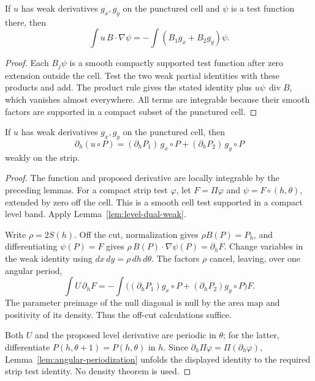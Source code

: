 \begin{lemma}
\label{lem:level-dual-weak}
\leanok
If $u$ has weak derivatives $g_x,g_y$ on the punctured cell and $\psi$
is a test function there, then
\[
  \int u\,B\cdot\nabla\psi=-\int(B_1g_x+B_2g_y)\psi .
\]
\end{lemma}

\begin{proof}
\leanok
Each $B_j\psi$ is a smooth compactly supported test function after
zero extension outside the cell. Test the two weak partial identities
with these products and add. The product rule gives the stated
identity plus $u\psi\,\operatorname{div}B$, which vanishes almost
everywhere. All terms are integrable because their smooth factors
are supported in a compact subset of the punctured cell.
\end{proof}

\begin{lemma}
\label{lem:action-angle-weak-level}
\leanok
If $u$ has weak derivatives $g_x,g_y$ on the punctured cell, then
\[
  \partial_h(u\circ P)=(\partial_hP_1)\,g_x\circ P
    +(\partial_hP_2)\,g_y\circ P
\]
weakly on the strip.
\end{lemma}

\begin{proof}
\leanok
The function and proposed derivative are locally integrable by the
preceding lemmas. For a compact strip test $\varphi$, let
$F=\Pi\varphi$ and $\psi=F\circ(h,\theta)$, extended by zero off the
cell. This is a smooth cell test supported in a compact level band.
Apply Lemma~\ref{lem:level-dual-weak}.

Write $\rho=2S(h)$. Off the cut, normalization gives
$\rho B(P)=P_h$, and differentiating $\psi(P)=F$ gives
$\rho\,B(P)\cdot\nabla\psi(P)=\partial_hF$.
Change variables in the weak identity using $dx\,dy=\rho\,dh\,d\theta$.
The factors $\rho$ cancel, leaving, over one angular period,
\[
  \int U\,\partial_hF
    =-\int\bigl((\partial_hP_1)g_x\circ P
                 +(\partial_hP_2)g_y\circ P\bigr)F .
\]
The parameter preimage of the null diagonal is null by the area map
and positivity of its density. Thus the off-cut calculations suffice.

Both $U$ and the proposed level derivative are periodic in $\theta$;
for the latter, differentiate $P(h,\theta+1)=P(h,\theta)$ in $h$.
Since $\partial_h\Pi\varphi=\Pi(\partial_h\varphi)$,
Lemma~\ref{lem:angular-periodization} unfolds the displayed identity
to the required strip test identity. No density theorem is used.
\end{proof}

